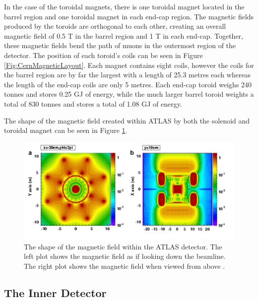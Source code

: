 \documentclass[12pt,a4paper,epsf,portrait,times,epsfig]{report}
\begin{document}
		In the case of the toroidal magnets, there is one toroidal magnet located in the barrel region and one toroidal magnet in each end-cap region. The magnetic fields produced by the toroids are orthogonal to each other, creating an overall magnetic field of 0.5 T in the barrel region and 1 T in each end-cap. Together, these magnetic fields bend the path of muons in the outermost region of the detector. The position of each toroid's coils can be seen in Figure \ref{Fig:CernMagneticLayout}. Each magnet contains eight coils, however the coils for the barrel region are by far the largest with a length of 25.3 metres each whereas the length of the end-cap coils are only 5 metres. Each end-cap toroid weighs 240 tonnes and stores 0.25 GJ of energy, while the much larger barrel toroid weights a total of 830 tonnes and stores a total of 1.08 GJ of energy. 
		
		The shape of the magnetic field created within ATLAS by both the solenoid and toroidal magnet can be seen in Figure \ref{Fig:CernMagneticField}. 
		
		\begin{figure}
			\centering
			\includegraphics[scale=0.4]{Magnetic_Field}
			\caption{The shape of the magnetic field within the ATLAS detector. The left plot shows the magnetic field as if looking down the beamline. The right plot shows the magnetic field when viewed from above \cite{Article:CernMagnets}. }
			\label{Fig:CernMagneticField}
		\end{figure}


		\subsection{The Inner Detector}\label{Section:InnerDetector}
\end{document}
